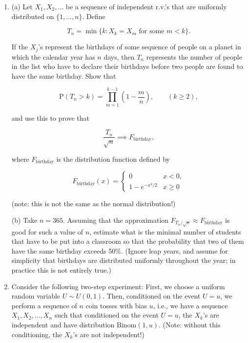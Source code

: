 \begin{enumerate}[label=\arabic*.]
\noindent to compute $\int_x^\infty (1+u^{-2})e^{-u^2/2}\,du$.
On the other hand, show that this integral is bounded
from above by
$(1+x^{-2})\int_x^{\infty} e^{-u^2/2}\,du$.

\item (a) Let $X_1, X_2, \ldots$ be a sequence of
independent r.v.'s that are uniformly distributed on
$\{1,\ldots,n\}$. Define

\[
T_n = \min\{ k : X_k = X_m\textrm{ for some }m<k\}.
\]

\noindent If the $X_j$'s represent the birthdays of some
sequence of people on a planet in which the calendar
year has $n$ days, then $T_n$ represents the number
of people in the list who have to declare their
birthdays before two people are found to have the same
birthday. Show that

\[
\mathrm{P}(T_n > k) = \prod_{m=1}^{k-1} \left(1-\frac{m}{n}\right), \qquad (k\ge 2),
\]

\noindent and use this to prove that

\[
\frac{T_n}{\sqrt{n}} \implies F_{\textrm{birthday}},
\]

\noindent where $F_{\textrm{birthday}}$ is the distribution
function defined by

\[
F_{\textrm{birthday}}(x) = \begin{cases} 0 & x<0, \\ 1- e^{-x^2/2} & x\ge 0 \end{cases}
\]

\noindent (note: this is not the same as the normal
distribution!)

(b) Take $n=365$. Assuming that the approximation
$F_{T_n/\sqrt{n}} \approx F_{\textrm{birthday}}$ is
good for such a value of $n$, estimate what is the
minimal number of students that have to be put into a
classroom so that the probability that two of them
have the same birthday exceeds 50\%. (Ignore leap
years, and assume for simplicity that birthdays are
distributed uniformly throughout the year; in practice
this is not entirely true.)

\item Consider the following two-step experiment: First, we
choose a uniform random variable $U \sim U(0,1)$.
Then, conditioned on the event $U=u$, we perform a
sequence of $n$ coin tosses with bias $u$, i.e., we
have a sequence $X_1,X_2,\ldots,X_n$ such that
conditioned on the event $U=u$, the $X_k$'s are
independent and have distribution
$\textrm{Binom}(1,u)$. (Note: without this
conditioning, the $X_k$'s are not independent!)


\end{enumerate}

